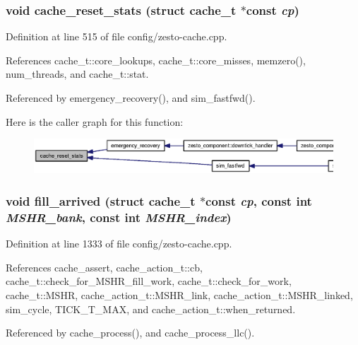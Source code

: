 \subsubsection[{cache\_\-reset\_\-stats}]{\setlength{\rightskip}{0pt plus 5cm}void cache\_\-reset\_\-stats (struct {\bf cache\_\-t} $\ast$const  {\em cp})}\label{zesto-cache_8h_aff01697c94f19565dfd6d631bf4bf76}




Definition at line 515 of file config/zesto-cache.cpp.

References cache\_\-t::core\_\-lookups, cache\_\-t::core\_\-misses, memzero(), num\_\-threads, and cache\_\-t::stat.

Referenced by emergency\_\-recovery(), and sim\_\-fastfwd().

Here is the caller graph for this function:\nopagebreak
\begin{figure}[H]
\begin{center}
\leavevmode
\includegraphics[width=391pt]{zesto-cache_8h_aff01697c94f19565dfd6d631bf4bf76_icgraph}
\end{center}
\end{figure}
\subsubsection[{fill\_\-arrived}]{\setlength{\rightskip}{0pt plus 5cm}void fill\_\-arrived (struct {\bf cache\_\-t} $\ast$const  {\em cp}, \/  const int {\em MSHR\_\-bank}, \/  const int {\em MSHR\_\-index})}\label{zesto-cache_8h_4d5f99649851ca3db130a4a6228a1f35}




Definition at line 1333 of file config/zesto-cache.cpp.

References cache\_\-assert, cache\_\-action\_\-t::cb, cache\_\-t::check\_\-for\_\-MSHR\_\-fill\_\-work, cache\_\-t::check\_\-for\_\-work, cache\_\-t::MSHR, cache\_\-action\_\-t::MSHR\_\-link, cache\_\-action\_\-t::MSHR\_\-linked, sim\_\-cycle, TICK\_\-T\_\-MAX, and cache\_\-action\_\-t::when\_\-returned.

Referenced by cache\_\-process(), and cache\_\-process\_\-llc().

